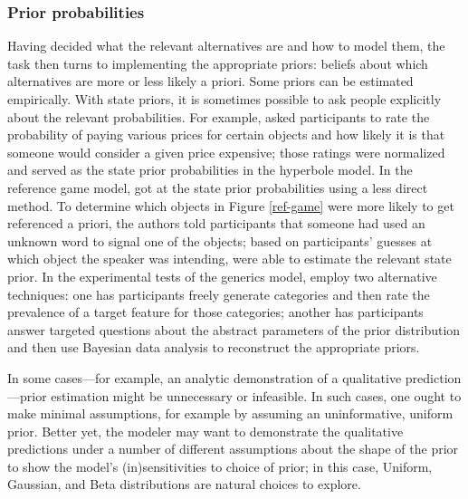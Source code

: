\documentclass{sp}
\newcommand{\gcs}[1]{\textcolor{blue}{[gcs: #1]}}
\newcommand{\mht}[1]{\textcolor{purple}{[mht: #1]}}
\begin{document}
\subsubsection{Prior probabilities}

Having decided what the relevant alternatives are and how to model them, the task then turns to implementing the appropriate priors: beliefs about which alternatives are more or less likely a priori. Some priors can be estimated empirically. With state priors, it is sometimes possible to ask people explicitly about the relevant probabilities. For example, \cite{kaoetal2014} asked participants to rate the probability of paying various prices for certain objects and how likely it is that someone would consider a given price expensive; those ratings were normalized and served as the state prior probabilities in the hyperbole model. In the reference game model, \cite{frankgoodman2012} got at the state prior probabilities using a less direct method. To determine which objects in Figure \ref{ref-game} were more likely to get referenced a priori, the authors told participants that someone had used an unknown word to signal one of the objects; based on participants' guesses at which object the speaker was intending, \citeauthor{frankgoodman2012} were able to estimate the relevant state prior. 
In the experimental tests of the generics model, \cite{tesslergoodman2019} employ two alternative techniques: one has participants freely generate categories and then rate the prevalence of a target feature for those categories; another has participants answer targeted questions about the abstract parameters of the prior distribution and then use Bayesian data analysis to reconstruct the appropriate priors. %


In some cases---for example, an analytic demonstration of a qualitative prediction---prior estimation might be unnecessary or infeasible. In such cases, one ought to make minimal assumptions, for example by assuming an uninformative, uniform prior. Better yet, the modeler may want to demonstrate the qualitative predictions under a number of different assumptions about the shape of the prior to show the model's (in)sensitivities to choice of prior; in this case, Uniform, Gaussian, and Beta distributions are natural choices to explore. 
\end{document}
